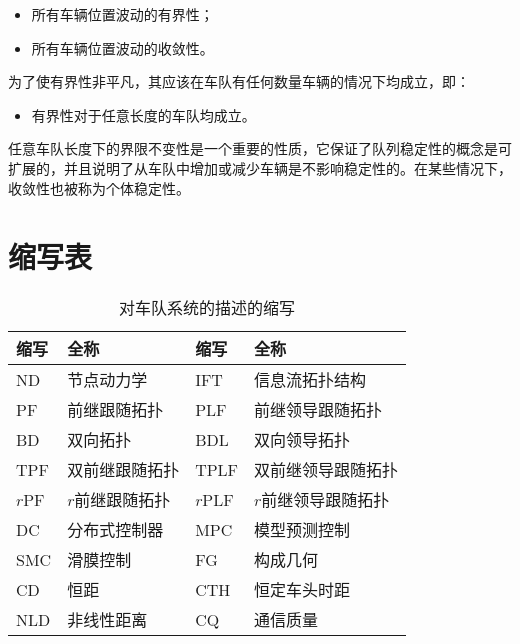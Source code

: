 \begin{translation}
\begin{itemize}
  \item 所有车辆位置波动的有界性；
  \item 所有车辆位置波动的收敛性。
\end{itemize}

为了使有界性非平凡，其应该在车队有任何数量车辆的情况下均成立，即：

\begin{itemize}
  \item 有界性对于任意长度的车队均成立。
\end{itemize}

任意车队长度下的界限不变性是一个重要的性质，它保证了队列稳定性的概念是可扩展的，并且说明了从车队中增加或减少车辆是不影响稳定性的。在某些情况下，收敛性也被称为个体稳定性。

\appendix

\section{缩写表}

\begin{table}
  \centering
  \caption{对车队系统的描述的缩写}
  \begin{tabular}{llll}
    \toprule
    缩写       &  全称           &  缩写       &  全称            \\
    \midrule
    ND        &  节点动力学      &  IFT        &  信息流拓扑结构    \\
    PF        &  前继跟随拓扑     &  PLF        &  前继领导跟随拓扑  \\
    BD        &  双向拓扑        &  BDL        &  双向领导拓扑     \\
    TPF       &  双前继跟随拓扑   &  TPLF       &  双前继领导跟随拓扑 \\
    $r$PF     &  $r$前继跟随拓扑  &  $r$PLF     &  $r$前继领导跟随拓扑 \\
    DC        &  分布式控制器     &  MPC        &  模型预测控制       \\
    SMC       &  滑膜控制        &  FG         &  构成几何           \\
    CD        &  恒距            &  CTH       &  恒定车头时距       \\
    NLD       &  非线性距离       &  CQ        &  通信质量          \\
    \bottomrule
  \end{tabular}
  \label{tab:appendix-translation-tableA1}
\end{table}


\end{translation}
